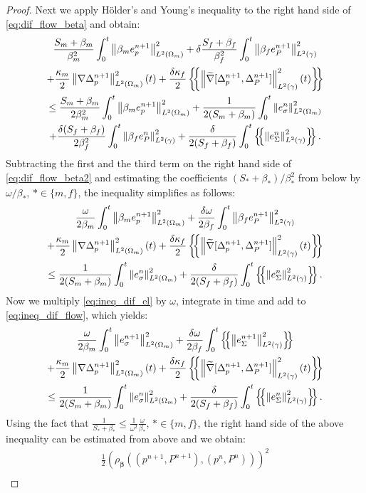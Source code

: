 \documentclass[a4paper]{article}
\def\agrad{\widetilde\nabla}
\def\avg#1{\left\{\mskip-5mu\left\{#1\right\}\mskip-5mu\right\}}
\def\norm#1{\left\|#1\right\|}
\def\vc#1{\mathbf{\boldsymbol{#1}}}     %
\newcommand{\ml}[1]{\begin{multline}#1\end{multline}}
\newcommand{\mls}[1]{\begin{multline*}#1\end{multline*}}
\begin{document}
\begin{proof}
Next we apply H\"older's and Young's inequality to the right hand side of \eqref{eq:dif_flow_beta} and obtain:
\ml{ \label{eq:dif_flow_beta2} \frac{S_m+\beta_m}{\beta_m^2}\int_0^t\norm{\beta_m e_p^{n+1}}_{L^2(\Omega_m)}^2 + \delta\frac{S_f+\beta_f}{\beta_f^2}\int_0^t\norm{\beta_f e_P^{n+1}}_{L^2(\gamma)}^2\\
+ \frac{\kappa_m}2\norm{\nabla\Delta_p^{n+1}}_{L^2(\Omega_m)}^2(t) + \frac{\delta\kappa_f}2\avg{\norm{\agrad[\Delta_p^{n+1},\Delta_P^{n+1}]}_{L^2(\gamma)}^2(t)}\\
\le \frac{S_m+\beta_m}{2\beta_m^2}\int_0^t\norm{\beta_m e_p^{n+1}}_{L^2(\Omega_m)}^2 + \frac1{2(S_m+\beta_m)}\int_0^t\norm{e_\sigma^n}_{L^2(\Omega_m)}^2\\
+ \frac{\delta(S_f+\beta_f)}{2\beta_f^2}\int_0^t\norm{\beta_f e_P^n}_{L^2(\gamma)}^2 + \frac\delta{2(S_f+\beta_f)}\int_0^t\avg{\norm{e_\Sigma^n}_{L^2(\gamma)}^2}. }
Subtracting the first and the third term on the right hand side of \eqref{eq:dif_flow_beta2} and estimating the coefficients $(S_*+\beta_*)/\beta_*^2$ from below by $\omega/\beta_*$, $*\in\{m,f\}$, the inequality simplifies as follows:
\ml{ \label{eq:ineq_dif_flow} \frac\omega{2\beta_m}\int_0^t\norm{\beta_m e_p^{n+1}}_{L^2(\Omega_m)}^2 + \frac{\delta\omega}{2\beta_f}\int_0^t\norm{\beta_f e_P^{n+1}}_{L^2(\gamma)}^2\\
+ \frac{\kappa_m}2\norm{\nabla\Delta_p^{n+1}}_{L^2(\Omega_m)}^2(t) + \frac{\delta\kappa_f}2\avg{\norm{\agrad[\Delta_p^{n+1},\Delta_P^{n+1}]}_{L^2(\gamma)}^2(t)}\\
\le \frac1{2(S_m+\beta_m)}\int_0^t\norm{e_\sigma^n}_{L^2(\Omega_m)}^2
+ \frac\delta{2(S_f+\beta_f)}\int_0^t\avg{\norm{e_\Sigma^n}_{L^2(\gamma)}^2}. }
Now we multiply \eqref{eq:ineq_dif_el} by $\omega$, integrate in time and add to \eqref{eq:ineq_dif_flow}, which yields:
\mls{ \frac\omega{2\beta_m}\int_0^t\norm{e_\sigma^{n+1}}_{L^2(\Omega_m)}^2 + \frac{\delta\omega}{2\beta_f}\int_0^t\avg{\norm{e_\Sigma^{n+1}}_{L^2(\gamma)}^2}\\
+ \frac{\kappa_m}2\norm{\nabla\Delta_p^{n+1}}_{L^2(\Omega_m)}^2(t) + \frac{\delta\kappa_f}2\avg{\norm{\agrad[\Delta_p^{n+1},\Delta_P^{n+1}]}_{L^2(\gamma)}^2(t)}\\
\le \frac1{2(S_m+\beta_m)}\int_0^t\norm{e_\sigma^n}_{L^2(\Omega_m)}^2
+ \frac\delta{2(S_f+\beta_f)}\int_0^t\avg{\norm{e_\Sigma^n}_{L^2(\gamma)}^2}. }
Using the fact that $\frac1{S_*+\beta_*}\le\frac1{\omega^2}\frac{\omega}{\beta_*}$, $*\in\{m,f\}$, the right hand side of the above inequality can be estimated from above and we obtain:
\mls{ \frac12\left(\rho_{\vc\beta}((p^{n+1},P^{n+1}),(p^n,P^n))\right)^2\\
}
\end{proof}
\end{document}
